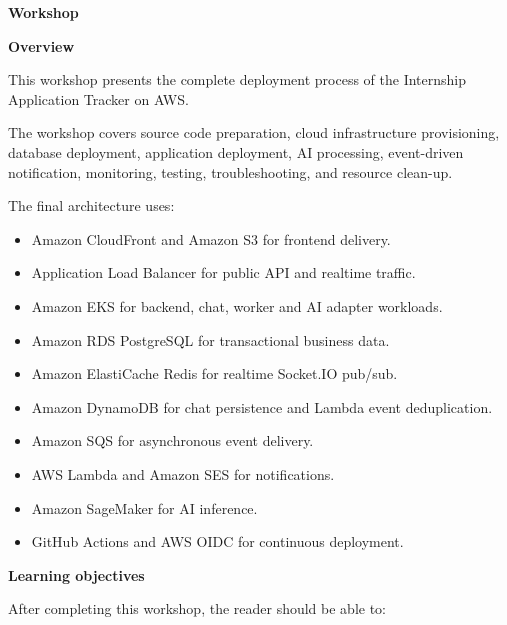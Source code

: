\vspace{0.5em}\noindent\textbf{Workshop}\par

\vspace{0.5em}\noindent\textbf{Overview}\par

This workshop presents the complete deployment process of the Internship
Application Tracker on AWS.

The workshop covers source code preparation, cloud infrastructure
provisioning, database deployment, application deployment, AI
processing, event-driven notification, monitoring, testing,
troubleshooting, and resource clean-up.

The final architecture uses:

\begin{itemize}
\tightlist
\item
  Amazon CloudFront and Amazon S3 for frontend delivery.
\item
  Application Load Balancer for public API and realtime traffic.
\item
  Amazon EKS for backend, chat, worker and AI adapter workloads.
\item
  Amazon RDS PostgreSQL for transactional business data.
\item
  Amazon ElastiCache Redis for realtime Socket.IO pub/sub.
\item
  Amazon DynamoDB for chat persistence and Lambda event deduplication.
\item
  Amazon SQS for asynchronous event delivery.
\item
  AWS Lambda and Amazon SES for notifications.
\item
  Amazon SageMaker for AI inference.
\item
  GitHub Actions and AWS OIDC for continuous deployment.
\end{itemize}

\vspace{0.5em}\noindent\textbf{Learning objectives}\par

After completing this workshop, the reader should be able to:

